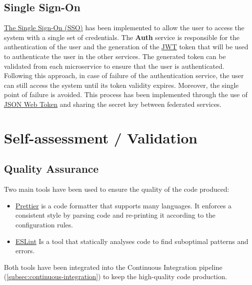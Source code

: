 \documentclass{scrartcl}
\begin{document}
    \subsection{Single Sign-On}
    \href{https://en.wikipedia.org/wiki/Single_sign-on}{The Single Sign-On (SSO)} has been implemented to allow the user to access the system with a single set of credentials.
    The \textbf{Auth} service is responsible for the authentication of the user and the generation of the \href{https://jwt.io/}{JWT} token that will be used to authenticate the user in the other services.
    The generated token can be validated from each microservice to ensure that the user is authenticated.
    Following this approach, in case of failure of the authentication service, the user can still access the system until its token validity expires.
    Moreover, the single point of failure is avoided.
    This process has been implemented through the use of \href{https://jwt.io/}{JSON Web Token} and sharing the secret key between federated services.

    

    \section{Self-assessment / Validation}

    \subsection{Quality Assurance}\label{subsec:quality-assurance}

    Two main tools have been used to ensure the quality of the code produced:

    \begin{itemize}
        \item \href{https://prettier.io/}{Prettier} is a code formatter that supports many languages.
        It enforces a consistent style by parsing code and re-printing it according to the configuration rules.
        \item \href{https://eslint.org/}{ESLint} Is a tool that statically analyses code to find suboptimal patterns and errors.
    \end{itemize}

    Both tools have been integrated into the Continuous Integration pipeline (\cref{subsec:continuous-integration}) to keep the high-quality code production.
\end{document}
